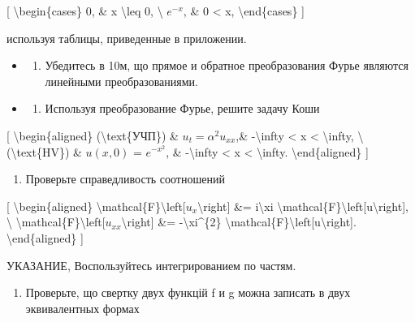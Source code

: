 \documentclass[
]{article}
\providecommand{\tightlist}{%
  \setlength{\itemsep}{0pt}\setlength{\parskip}{0pt}}
\begin{document}
{{{[} \textbackslash begin\{cases\} 0, \& x \textbackslash leq 0,
\textbackslash{} \(e^{-x}\), \& 0 \textless{} x,
\textbackslash end\{cases\} {]}

используя таблицы, приведенные в приложении.

\begin{itemize}
\tightlist
\item
  \begin{enumerate}
  \def\labelenumi{\arabic{enumi}.}
  \setcounter{enumi}{1}
  \tightlist
  \item
    Убедитесь в 10м, що прямое и обратное преобразования Фурье являются
    линейными преобразованиями.
  \end{enumerate}
\item
  \begin{enumerate}
  \def\labelenumi{\arabic{enumi}.}
  \setcounter{enumi}{2}
  \tightlist
  \item
    Используя преобразование Фурье, решите задачу Коши
  \end{enumerate}
\end{itemize}

{[} \textbackslash begin\{aligned\} (\textbackslash text\{УЧП\}) \&
\(u_t = \alpha^2 u_{xx}\),\& -\textbackslash infty \textless{} x
\textless{} \textbackslash infty, \textbackslash{}
(\textbackslash text\{HV\}) \& \(u(x, 0)\) = \(e^{-x^2}\), \&
-\textbackslash infty \textless{} x \textless{} \textbackslash infty.
\textbackslash end\{aligned\} {]}

\begin{enumerate}
\def\labelenumi{\arabic{enumi}.}
\setcounter{enumi}{3}
\tightlist
\item
  Проверьте справедливость соотношений
\end{enumerate}

{[} \textbackslash begin\{aligned\}
\textbackslash mathcal\{F\}\textbackslash left{[}\(u_{x}\)\textbackslash right{]}
\&= i\textbackslash xi
\textbackslash mathcal\{F\}\textbackslash left{[}u\textbackslash right{]},
\textbackslash{}
\textbackslash mathcal\{F\}\textbackslash left{[}\(u_{xx}\)\textbackslash right{]}
\&= -\textbackslash xi\^{}\{2\}
\textbackslash mathcal\{F\}\textbackslash left{[}u\textbackslash right{]}.
\textbackslash end\{aligned\} {]}

УКАЗАНИЕ, Воспользуйтесь интегрированием по частям.

\begin{enumerate}
\def\labelenumi{\arabic{enumi}.}
\setcounter{enumi}{4}
\tightlist
\item
  Проверьте, що свертку двух функцій f и g можна записать в двух
  эквивалентных формах
\end{enumerate}

}}
\end{document}

